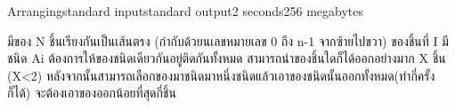 \begin{problem}{Arranging}{standard input}{standard output}{2 seconds}{256 megabytes}

มีของ N ชิ้นเรียงกันเป็นเส้นตรง (กำกับด้วยนเลขหมายเลข 0 ถึง n-1 จากซ้ายไปขวา) ของชิ้นที่ I มีชนิด Ai ต้องการให้ของชนิดเดียวกันอยู่ติดกันทั้งหมด สามารถนำของชิ้นใดก็ได้ออกอย่างมาก X ชิ้น (X<2) หลังจากนั้นสามารถเลือกของมาชนิดมาหนึ่งชนิดแล้วเอาของชนิดนั้นออกทั้งหมด(ทำกี่ครั้งก็ได้) จะต้องเอาของออกน้อยที่สุดกี่ชิ้น


\end{problem}


